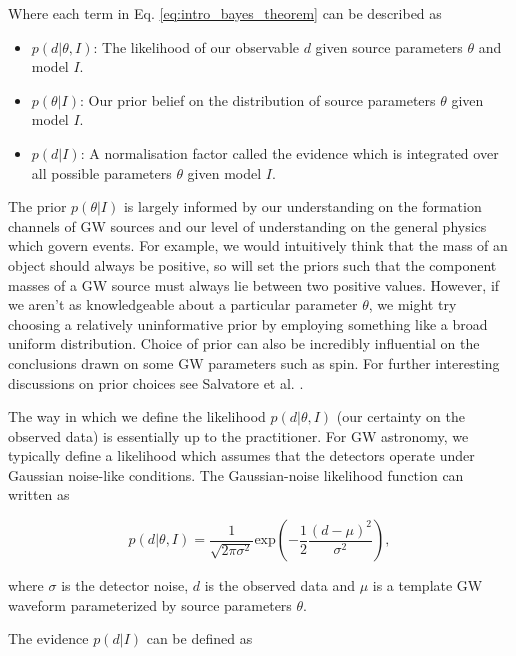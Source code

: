 %
%
Where each term in Eq. \ref{eq:intro_bayes_theorem} can be described as 

\begin{itemize}
    \item $p(d|\theta, I)$: The likelihood of our observable $d$ given source parameters $\theta$ 
    and model $I$.
    \item $p(\theta|I)$: Our prior belief on the distribution of source parameters $\theta$ given model 
    $I$.
    \item $p(d|I)$: A normalisation factor called the evidence which is integrated over all possible parameters $\theta$ given model $I$.
\end{itemize}

The prior $p(\theta|I)$ is largely informed by our understanding on the formation channels of \ac{GW} sources and our level of understanding on the general physics which govern events. For example, we would intuitively think that the mass of an object should always be positive, so will set the priors such that the component masses of a \ac{GW} source must always lie between two positive values. However, if we aren't as knowledgeable about a particular parameter $\theta$, we might try choosing a relatively uninformative prior by employing something like a broad uniform distribution. Choice of prior can also be incredibly influential on the conclusions drawn on some \ac{GW} parameters such as spin. For further interesting discussions on prior choices see Salvatore et al. \cite{PhysRevLett.119.251103}.

%
%
The way in which we define the likelihood $p(d|\theta, I)$ (our certainty on the observed data) is essentially up to the practitioner. For \ac{GW} astronomy, we typically define a likelihood which assumes that the detectors operate under Gaussian noise-like conditions. The Gaussian-noise likelihood function can written as 

\begin{equation}
    p(d|\theta, I) = \frac{1}{\sqrt{2\pi \sigma^2}} \textrm{exp}\left(-\frac{1}{2} 
    \frac{(d - \mu)^2}{\sigma^2}\right),
\end{equation}

where $\sigma$ is the detector noise, $d$ is the observed data and $\mu$ is a template \ac{GW} waveform parameterized by source parameters $\theta$. 

%
%
The evidence $p(d|I)$ can be defined as 

